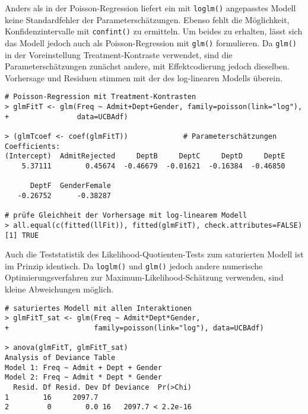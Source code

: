 Anders als in der Poisson-Regression liefert ein mit \lstinline!loglm()! angepasstes Modell keine Standardfehler der Parameterschätzungen. Ebenso fehlt die Möglichkeit, Konfidenzintervalle mit \lstinline!confint()! zu ermitteln. Um beides zu erhalten, lässt sich das Modell jedoch auch als Poisson-Regression mit \lstinline!glm()! formulieren. Da \lstinline!glm()! in der Voreinstellung Treatment-Kontraste verwendet, sind die Parameterschätzungen zunächst andere, mit Effektcodierung jedoch dieselben. Vorhersage und Residuen stimmen mit der des log-linearen Modells überein.
\begin{lstlisting}
# Poisson-Regression mit Treatment-Kontrasten
> glmFitT <- glm(Freq ~ Admit+Dept+Gender, family=poisson(link="log"),
+                data=UCBAdf)

> (glmTcoef <- coef(glmFitT))             # Parameterschätzungen
Coefficients:
(Intercept)  AdmitRejected     DeptB     DeptC     DeptD     DeptE
    5.37111        0.45674  -0.46679  -0.01621  -0.16384  -0.46850

      DeptF  GenderFemale
   -0.26752      -0.38287

# prüfe Gleichheit der Vorhersage mit log-linearem Modell
> all.equal(c(fitted(llFit)), fitted(glmFitT), check.attributes=FALSE)
[1] TRUE
\end{lstlisting}

Auch die Teststatistik des Likelihood-Quotienten-Tests zum saturierten Modell ist im Prinzip identisch. Da \lstinline!loglm()! und \lstinline!glm()! jedoch andere numerische Optimierungsverfahren zur Maximum-Likelihood-Schätzung verwenden, sind kleine Abweichungen möglich.
\begin{lstlisting}
# saturiertes Modell mit allen Interaktionen
> glmFitT_sat <- glm(Freq ~ Admit*Dept*Gender,
+                    family=poisson(link="log"), data=UCBAdf)

> anova(glmFitT, glmFitT_sat)
Analysis of Deviance Table
Model 1: Freq ~ Admit + Dept + Gender
Model 2: Freq ~ Admit * Dept * Gender
  Resid. Df Resid. Dev Df Deviance  Pr(>Chi)    
1        16     2097.7                          
2         0        0.0 16   2097.7 < 2.2e-16
\end{lstlisting}

